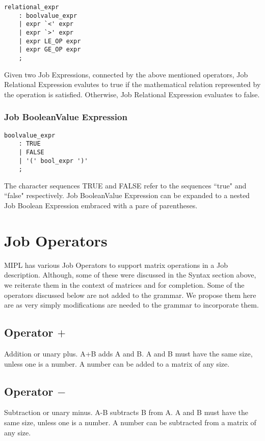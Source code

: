 \documentclass[prodmode,acmtecs]{acmsmall}
\begin{document}
\begin{lstlisting}
relational_expr
	: boolvalue_expr
	| expr `<' expr
	| expr `>' expr
	| expr LE_OP expr
	| expr GE_OP expr
	;
\end{lstlisting}

Given two Job Expressions, connected by the above mentioned operators, 
Job Relational Expression evalutes to true if the mathematical relation
represented by the operation is satisfied. Otherwise, Job Relational
Expression evaluates to false. 
\medskip


\subsubsection{Job BooleanValue Expression}

\begin{lstlisting}
boolvalue_expr
	: TRUE
	| FALSE
	| '(' bool_expr ')'
	;
\end{lstlisting}

The character sequences TRUE and FALSE refer to the sequences ``true"
and ``false" respectively.  Job BooleanValue Expression can be expanded
to a nested Job Boolean Expression embraced with a pare of parentheses.
\medskip


\section{Job Operators}
MIPL has various Job Operators to support matrix operations in a Job
description. Although, some of these were discussed in the Syntax
section above, we reiterate them in the context of matrices and for
completion. Some of the operators discussed below are not added to 
the grammar. We propose them here are as very simply modifications 
are needed to the grammar to incorporate them.

\subsection{Operator $+$}
Addition or unary plus. A+B adds A and B. A and B must have the same size,
unless one is a number. A number can be added to a matrix of any size.
\medskip

\subsection{Operator $-$}
Subtraction or unary minus. A-B subtracts B from A. A and B must have the
same size, unless one is a number. A number can be subtracted from a matrix
of any size.
\medskip
\end{document}
